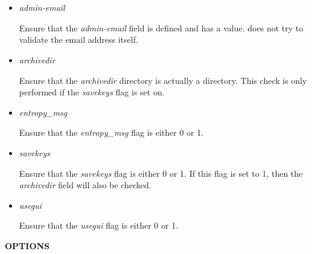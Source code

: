 \begin{itemize}

\item {\it admin-email}\verb" "

Ensure that the {\it admin-email} field is defined and has a value.
 does not try to validate the email address itself.

\item {\it archivedir}\verb" "

Ensure that the {\it archivedir} directory is actually a directory.
This check is only performed if the {\it savekeys} flag is set on.

\item {\it entropy\_msg}\verb" "

Ensure that the {\it entropy\_msg} flag is either 0 or 1.

\item {\it savekeys}\verb" "

Ensure that the {\it savekeys} flag is either 0 or 1.
If this flag is set to 1, then the {\it archivedir} field will also be checked.

\item {\it usegui}\verb" "

Ensure that the {\it usegui} flag is either 0 or 1.

\end{itemize}

{\bf OPTIONS}

